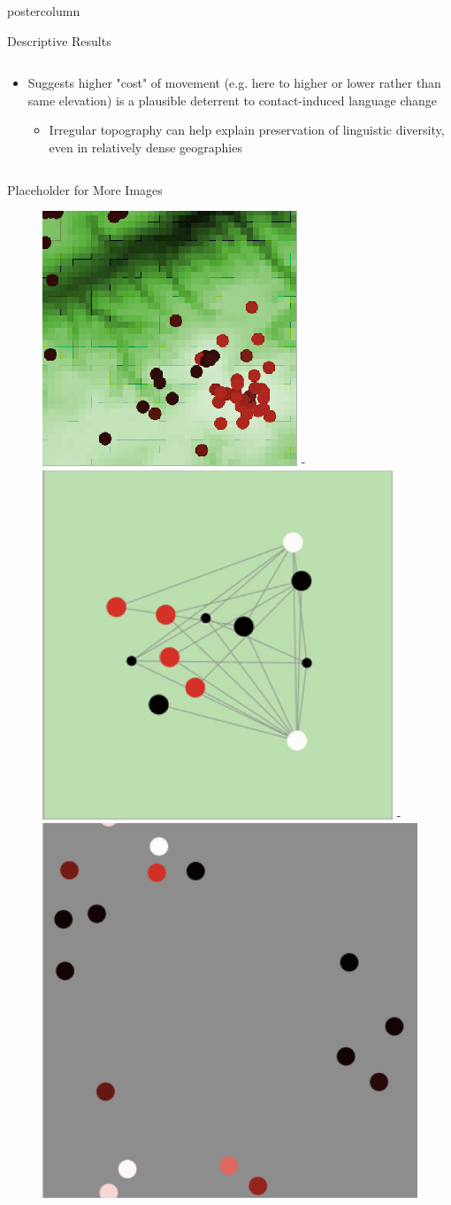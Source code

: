\documentclass[final,hyperref={pdfpagelabels=false}]{beamer}
\begin{document}
\begin{frame}
\begin{columns}
\begin{column}{.33\textwidth}
\begin{beamercolorbox}[center,wd=\textwidth]{postercolumn}
\begin{minipage}[T]{.95\textwidth}
{\begin{block}{Descriptive Results}
\begin{columns}
\begin{column}{.99\textwidth}
\begin{itemize}
                    \item Suggests higher "cost" of movement (e.g. here to higher or lower rather than same elevation) is a plausible deterrent to
                     contact-induced language change
                      \begin{itemize}
                        \item Irregular topography can help explain preservation of linguistic diversity, even in relatively dense geographies
                      \end{itemize}
                  \end{itemize}
                \end{column}
              \end{columns}
            \end{block}
            \vfill
            \begin{block}{Placeholder for More Images}
              \begin{figure}
                \centering
                \includegraphics[width=0.32\linewidth]{images/netlogo}
                -
                \includegraphics[width=0.32\linewidth]{images/networks}
                -
                \includegraphics[width=0.32\linewidth]{images/random_movement}

\end{figure}
\end{block}}
\end{minipage}
\end{beamercolorbox}
\end{column}
\end{columns}
\end{frame}
\end{document}
